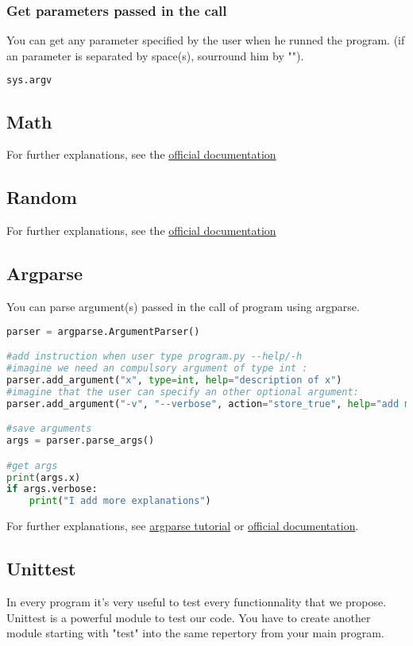 \documentclass[a4paper, 12pt, titlepage]{scrartcl} %
\begin{document}
\subsubsection{Get parameters passed in the call}
You can get any parameter specified by the user when he runned the program. (if an parameter is separated by space(s), sourround him by "").
\begin{lstlisting}[language=Python]
sys.argv
\end{lstlisting}

\subsection{Math}
For further explanations, see the \href{https://docs.python.org/3/library/math.html}{official documentation}

\subsection{Random}
For further explanations, see the \href{https://docs.python.org/3/library/random.html}{official documentation}

\subsection{Argparse}
You can parse argument(s) passed in the call of program using argparse.
\begin{lstlisting}[language=Python]
parser = argparse.ArgumentParser()

#add instruction when user type program.py --help/-h
#imagine we need an compulsory argument of type int :
parser.add_argument("x", type=int, help="description of x")
#imagine that the user can specify an other optional argument:
parser.add_argument("-v", "--verbose", action="store_true", help="add more explanation")

#save arguments
args = parser.parse_args()

#get args
print(args.x)
if args.verbose:
    print("I add more explanations")
\end{lstlisting}
For further explanations, see \href{http://www.sharelatex.com}{argparse tutorial} or  \href{https://docs.python.org/3/library/argparse.html}{official documentation}.


\subsection{Unittest}
In every program it's very useful to test every functionnality that we propose. Unittest is a powerful module to test our code. You have to create another module starting with "test" into the same repertory from your main program.
\end{document}
